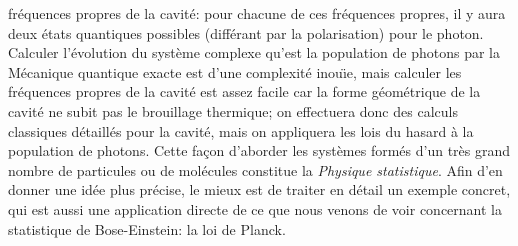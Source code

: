 fr\'equences propres de la cavit\'e: pour chacune de ces fr\'equences 
propres, il y aura deux \'etats quantiques possibles (diff\'erant par la 
polarisation) pour le photon. Calculer l'\'evolution du syst\`eme complexe 
qu'est la population de photons par la M\'ecanique quantique exacte est 
d'une complexit\'e inou\"\i e, mais calculer les fr\'equences propres de  
la cavit\'e est assez facile car la forme g\'eom\'etrique de la cavit\'e  
ne subit pas le brouillage thermique; on effectuera donc des calculs 
classiques d\'etaill\'es pour la cavit\'e, mais on appliquera les lois du 
hasard \`a  la population de photons. Cette fa\c con d'aborder les 
syst\`emes form\'es d'un tr\`es grand nombre de particules ou de 
mol\'ecules constitue la  {\it Physique statistique}. Afin d'en donner une 
id\'ee plus pr\'ecise, le mieux est de traiter en d\'etail un exemple  
concret, qui est aussi une application directe de ce que nous venons de  
voir concernant la statistique de Bose-Einstein: la loi de Planck. 
 
\bigskip
 
